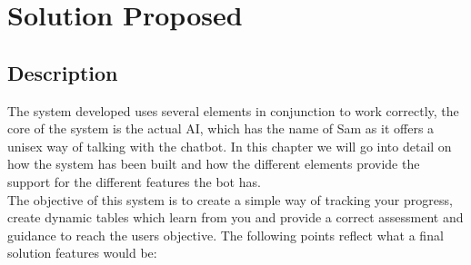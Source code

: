 \chapter{Solution Proposed}\label{chap:4}

\section{Description}\label{sec:chap4_desc}
The system developed uses several elements in conjunction to work correctly, the core of the system is the actual AI, which has the name of Sam as it offers a unisex way of talking with the chatbot. In this chapter we will go into detail on how the system has been built and how the different elements provide the support for the different features the bot has.\\
The objective of this system is to create a simple way of tracking your progress, create dynamic tables which learn from you and provide a correct assessment and guidance to reach the users objective. The following points reflect what a final solution features would be:\\

